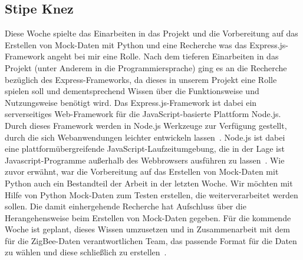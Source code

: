 \documentclass[]{article}
\begin{document}
\subsection{Stipe Knez}
Diese Woche spielte das Einarbeiten in das Projekt und die Vorbereitung auf das Erstellen von Mock-Daten mit Python und eine Recherche was das Express.js-Framework angeht bei mir eine Rolle.
Nach dem tieferen Einarbeiten in das Projekt (unter Anderem in die Programmiersprache) ging es an die Recherche bezüglich des Express-Frameworks, da dieses in unserem Projekt eine Rolle spielen soll und dementsprechend Wissen über die Funktionsweise und Nutzungsweise benötigt wird. Das Express.js-Framework ist dabei ein serverseitiges Web-Framework für die JavaScript-basierte Plattform Node.js. Durch dieses Framework werden in Node.js Werkzeuge zur Verfügung gestellt, durch die sich Webanwendungen leichter entwickeln lassen~\cite{Express.js}. Node.js ist dabei eine  plattformübergreifende JavaScript-Laufzeitumgebung, die in der Lage ist Javascript-Programme außerhalb des Webbrowsers ausführen zu lassen~\cite{Node.js}.
Wie zuvor erwähnt, war die Vorbereitung auf das Erstellen von Mock-Daten mit Python auch ein Bestandteil der Arbeit in der letzten Woche. Wir möchten mit Hilfe von Python Mock-Daten zum Testen erstellen, die weiterverarbeitet werden sollen. Die damit einhergehende Recherche hat Aufschluss über die Herangehensweise beim Erstellen von Mock-Daten gegeben. Für die kommende Woche ist geplant, dieses Wissen umzusetzen und in Zusammenarbeit mit dem für die ZigBee-Daten verantwortlichen Team, das passende Format für die Daten zu wählen und diese schließlich zu erstellen~\cite{mockdata}.
\end{document}
